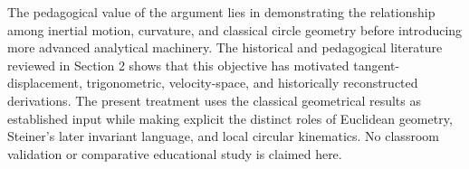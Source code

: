 \documentclass[preprint,12pt,3p,nopreprintline]{elsarticle}
\numberwithin{equation}{section}
\theoremstyle{remark}
\begin{document}
The pedagogical value of the argument lies in demonstrating the relationship among inertial motion, curvature, and classical circle geometry before introducing more advanced analytical machinery. The historical and pedagogical literature reviewed in Section 2 shows that this objective has motivated tangent-displacement, trigonometric, velocity-space, and historically reconstructed derivations. The present treatment uses the classical geometrical results as established input while making explicit the distinct roles of Euclidean geometry, Steiner's later invariant language, and local circular kinematics. No classroom validation or comparative educational study is claimed here.



\end{document}
